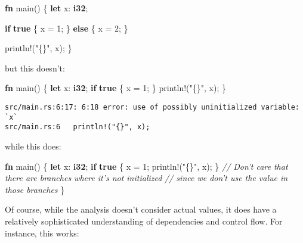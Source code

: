 \documentclass[a4paper,]{book}
\newenvironment{Shaded}{\begin{snugshade}}{\end{snugshade}}
\newcommand{\KeywordTok}[1]{\textcolor[rgb]{0.13,0.29,0.53}{\textbf{{#1}}}}
\newcommand{\DecValTok}[1]{\textcolor[rgb]{0.00,0.00,0.81}{{#1}}}
\newcommand{\StringTok}[1]{\textcolor[rgb]{0.31,0.60,0.02}{{#1}}}
\newcommand{\CommentTok}[1]{\textcolor[rgb]{0.56,0.35,0.01}{\textit{{#1}}}}
\newcommand{\OtherTok}[1]{\textcolor[rgb]{0.56,0.35,0.01}{{#1}}}
\newcommand{\NormalTok}[1]{{#1}}
\begin{document}
\begin{Shaded}
\begin{Highlighting}[]
\KeywordTok{fn} \NormalTok{main() \{}
    \KeywordTok{let} \NormalTok{x: }\KeywordTok{i32}\NormalTok{;}

    \KeywordTok{if} \KeywordTok{true} \NormalTok{\{}
        \NormalTok{x = }\DecValTok{1}\NormalTok{;}
    \NormalTok{\} }\KeywordTok{else} \NormalTok{\{}
        \NormalTok{x = }\DecValTok{2}\NormalTok{;}
    \NormalTok{\}}

    \OtherTok{println!}\NormalTok{(}\StringTok{"\{\}"}\NormalTok{, x);}
\NormalTok{\}}
\end{Highlighting}
\end{Shaded}

but this doesn't:

\begin{Shaded}
\begin{Highlighting}[]
\KeywordTok{fn} \NormalTok{main() \{}
    \KeywordTok{let} \NormalTok{x: }\KeywordTok{i32}\NormalTok{;}
    \KeywordTok{if} \KeywordTok{true} \NormalTok{\{}
        \NormalTok{x = }\DecValTok{1}\NormalTok{;}
    \NormalTok{\}}
    \OtherTok{println!}\NormalTok{(}\StringTok{"\{\}"}\NormalTok{, x);}
\NormalTok{\}}
\end{Highlighting}
\end{Shaded}

\begin{verbatim}
src/main.rs:6:17: 6:18 error: use of possibly uninitialized variable: `x`
src/main.rs:6   println!("{}", x);
\end{verbatim}

while this does:

\begin{Shaded}
\begin{Highlighting}[]
\KeywordTok{fn} \NormalTok{main() \{}
    \KeywordTok{let} \NormalTok{x: }\KeywordTok{i32}\NormalTok{;}
    \KeywordTok{if} \KeywordTok{true} \NormalTok{\{}
        \NormalTok{x = }\DecValTok{1}\NormalTok{;}
        \OtherTok{println!}\NormalTok{(}\StringTok{"\{\}"}\NormalTok{, x);}
    \NormalTok{\}}
    \CommentTok{// Don't care that there are branches where it's not initialized}
    \CommentTok{// since we don't use the value in those branches}
\NormalTok{\}}
\end{Highlighting}
\end{Shaded}

Of course, while the analysis doesn't consider actual values, it does
have a relatively sophisticated understanding of dependencies and
control flow. For instance, this works:
\end{document}
